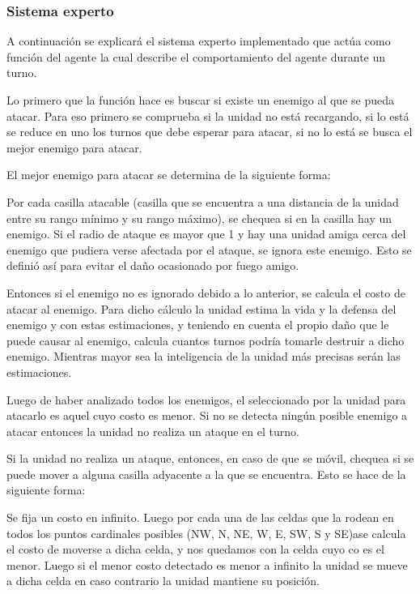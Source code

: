 \subsubsection{Sistema experto}

A continuación se explicará el sistema experto implementado que actúa como función del agente la cual describe el comportamiento del agente durante un turno.

Lo primero que la función hace es buscar si existe un enemigo al que se pueda atacar. Para eso primero se comprueba si la unidad no está recargando, si lo está se reduce en uno los turnos que debe esperar para atacar, si no lo está se busca el mejor enemigo para atacar. 
 
El mejor enemigo para atacar se determina de la siguiente forma:
 
Por cada casilla atacable (casilla que se encuentra a una distancia de la unidad entre su rango mínimo y su rango máximo), se chequea si en la casilla hay un enemigo. Si el radio de ataque es mayor que 1 y hay una unidad amiga cerca del enemigo que pudiera verse afectada por el ataque, se ignora este enemigo. Esto se definió así para evitar el daño ocasionado por fuego amigo.
 
Entonces si el enemigo no es ignorado debido a lo anterior, se calcula el costo de atacar al enemigo. Para dicho cálculo la unidad estima la vida y la defensa del enemigo y con estas estimaciones, y teniendo en cuenta el propio da\~{n}o que le puede causar al enemigo, calcula cuantos turnos podría tomarle destruir a dicho enemigo. Mientras mayor sea la inteligencia de la unidad más precisas serán las estimaciones.

Luego de haber analizado todos los enemigos, el seleccionado por la unidad para atacarlo es aquel cuyo costo es menor. Si no se detecta ningún posible enemigo a atacar entonces la unidad no realiza un ataque en el turno.
 
Si la unidad no realiza un ataque, entonces, en caso de que se móvil, chequea si se puede mover a alguna casilla adyacente a la que se encuentra. Esto se hace de la siguiente forma:
 
Se fija un costo en infinito. Luego por cada una de las celdas que la rodean en todos los puntos cardinales posibles (NW, N, NE, W, E, SW, S y SE)ase calcula el costo de moverse a dicha celda, y nos quedamos con la celda cuyo co es el menor. Luego si el menor costo detectado es menor a infinito la unidad se mueve a dicha celda en caso contrario la unidad mantiene su posición. 
 
